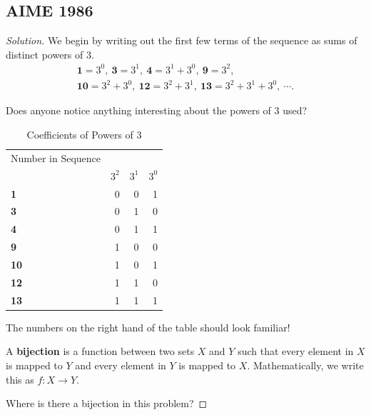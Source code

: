 \subsection{AIME 1986}
\begin{proof}[Solution]
We begin by writing out the first few terms of the sequence as sums of distinct powers of $3$.  \begin{eqnarray*}\textbf{1}=3^0,\: \textbf{3}=3^1,\:\textbf{4}=3^1+3^0,\: \textbf{9}=3^2,\: \\ \textbf{10}=3^2+3^0,\: \textbf{12}=3^2+3^1,\: \textbf{13}=3^2+3^1+3^0,\: \cdots. \end{eqnarray*}

Does anyone notice anything interesting about the powers of $3$ used?

\clearpage


\begin{table}[h]
	\centering
	\begin{tabular}{|l | r r r|}
		\toprule
		Number in Sequence & & &\\
		                   & $3^2$ & $3^1$ & $3^0$ \\ 
		\midrule
		\textbf{1} & 0 & 0 & 1 \\
		\textbf{3} & 0 & 1 & 0 \\
		\textbf{4} & 0 & 1 & 1 \\
		\textbf{9} & 1 & 0 & 0 \\
		\textbf{10} & 1 & 0 & 1 \\
		\textbf{12} & 1 & 1 & 0 \\
		\textbf{13} & 1 & 1 & 1 \\
		\bottomrule
	\end{tabular}
	\caption{Coefficients of Powers of 3}
	\label{tab-pow3}
\end{table}


\clearpage

The numbers on the right hand of the table should look familiar!
\newline
\begin{defi}  A \textbf{bijection} is a function between two sets $X$ and $Y$ such that every element in $X$ is mapped to $Y$ and every element in $Y$ is mapped to $X$. Mathematically, we write this as $f:X\to Y$.  \end{defi}

Where is there a bijection in this problem?  

\clearpage


\end{proof}
